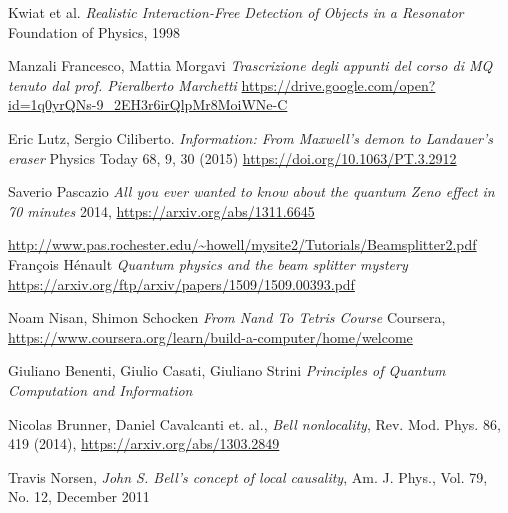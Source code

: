 \documentclass[12pt]{report} %
\DeclareRobustCommand{\MQ}{{\small\textsc{MQ}}\xspace}
\theoremstyle{plain}
\theoremstyle{definition}
\theoremstyle{remark}
\begin{document}











\listoffigures

\listoftables

\clearpage
\begin{thebibliography}{9}
Kwiat et al.
\textit{Realistic Interaction-Free Detection of Objects in a Resonator}
Foundation of Physics, 1998

Manzali Francesco, Mattia Morgavi
\textit{Trascrizione degli appunti del corso di \MQ tenuto dal prof. Pieralberto Marchetti}
\url{https://drive.google.com/open?id=1q0yrQNs-9_2EH3r6irQlpMr8MoiWNe-C}

Eric Lutz, Sergio Ciliberto.
\textit{Information: From Maxwell’s demon to Landauer’s eraser}
Physics Today 68, 9, 30 (2015) \url{https://doi.org/10.1063/PT.3.2912}

Saverio Pascazio
\textit{All you ever wanted to know about the quantum Zeno effect in 70 minutes}
2014, \url{https://arxiv.org/abs/1311.6645}

\url{http://www.pas.rochester.edu/~howell/mysite2/Tutorials/Beamsplitter2.pdf}
François Hénault
\textit{Quantum physics and the beam splitter mystery}
\url{https://arxiv.org/ftp/arxiv/papers/1509/1509.00393.pdf}

Noam Nisan, Shimon Schocken
\textit{From Nand To Tetris Course}
Coursera, \url{https://www.coursera.org/learn/build-a-computer/home/welcome}

Giuliano Benenti, Giulio Casati, Giuliano Strini
\textit{Principles of Quantum Computation and Information}

Nicolas Brunner, Daniel Cavalcanti et. al., \textit{Bell nonlocality}, Rev. Mod. Phys. 86, 419 (2014), \url{https://arxiv.org/abs/1303.2849}

Travis Norsen, 
\textit{John S. Bell’s concept of local causality},  Am. J. Phys., Vol. 79, No. 12, December 2011


\end{thebibliography}
\end{document}
